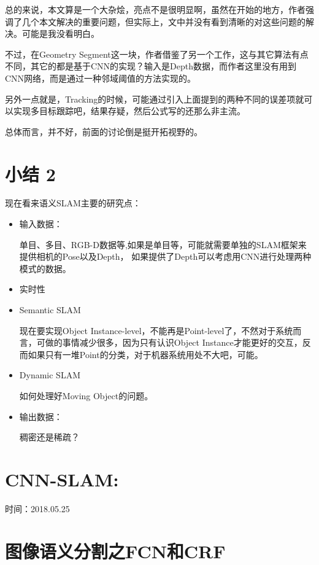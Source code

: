总的来说，本文算是一个大杂烩，亮点不是很明显啊，虽然在开始的地方，作者强调了几个本文解决的重要问题，但实际上，文中并没有看到清晰的对这些问题的解决。可能是我没看明白。

不过，在Geometry Segment这一块，作者借鉴了另一个工作，这与其它算法有点不同，其它的都是基于CNN的实现？输入是Depth数据，而作者这里没有用到CNN网络，而是通过一种邻域阈值的方法实现的。

另外一点就是，Tracking的时候，可能通过引入上面提到的两种不同的误差项就可以实现多目标跟踪吧，结果存疑，然后公式写的还那么非主流。

总体而言，并不好，前面的讨论倒是挺开拓视野的。


\section{小结 2}

现在看来语义SLAM主要的研究点：
\begin{itemize}
\item 输入数据：

单目、多目、RGB-D数据等,如果是单目等，可能就需要单独的SLAM框架来提供相机的Pose以及Depth， 如果提供了Depth可以考虑用CNN进行处理两种模式的数据。

\item 实时性

\item Semantic SLAM

现在要实现Object Instance-level，不能再是Point-level了，不然对于系统而言，可做的事情减少很多，因为只有认识Object Instance才能更好的交互，反而如果只有一堆Point的分类，对于机器系统用处不大吧，可能。

\item Dynamic SLAM

如何处理好Moving Object的问题。

\item 输出数据：

稠密还是稀疏？

\end{itemize}


\section[CNN-SLAM]{CNN-SLAM:}

{\color{red} 时间：2018.05.25}




\section{图像语义分割之FCN和CRF}

